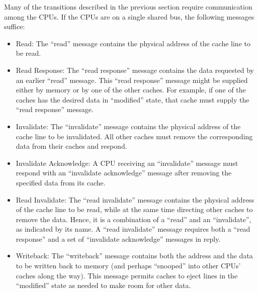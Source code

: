 Many of the transitions described in the previous section require
communication among the CPUs.
If the CPUs are on a single shared bus, the following messages suffice:
\begin{itemize}
\item	Read:
	The ``read'' message contains the physical address of the cache line
	to be read.
\item	Read Response:
	The ``read response'' message contains the data requested by an
	earlier ``read'' message.
	This ``read response'' message might be supplied either by
	memory or by one of the other caches.
	For example, if one of the caches has the desired data in
	``modified'' state, that cache must supply the ``read response''
	message.
\item	Invalidate:
	The ``invalidate'' message contains the physical address of the
	cache line to be invalidated.
	All other caches must remove the corresponding data from their
	caches and respond.
\item	Invalidate Acknowledge:
	A CPU receiving an ``invalidate'' message must respond with an
	``invalidate acknowledge'' message after removing the specified
	data from its cache.
\item	Read Invalidate:
	The ``read invalidate'' message contains the physical address
	of the cache line to be read, while at the same time directing
	other caches to remove the data.
	Hence, it is a combination of a ``read'' and an ``invalidate'',
	as indicated by its name.
	A ``read invalidate'' message requires both a ``read response''
	and a set of ``invalidate acknowledge'' messages in reply.
\item	Writeback:
	The ``writeback'' message contains both the address and the
	data to be written back to memory (and perhaps ``snooped''
	into other CPUs' caches along the way).
	This message permits caches to eject lines in the ``modified''
	state as needed to make room for other data.
\end{itemize}

